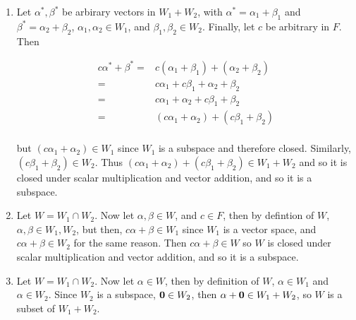 \documentclass[12pt]{article}
\renewcommand{\vec}[1]{
  {\bf #1}
}
\begin{document}
  {
    \begin{enumerate}
      \item Let $\alpha^*, \beta^*$ be arbirary vectors in $W_1 + W_2$, with
        $\alpha^* = \alpha_1 + \beta_1$ and $\beta^* = \alpha_2 + \beta_2$,
        $\alpha_1, \alpha_2 \in W_1$, and $\beta_1, \beta_2 \in W_2$. Finally,
        let $c$ be arbitrary in $F$. Then 

        \begin{align*}
          c \alpha^* + \beta^*
         =&c (\alpha_1 + \beta_1) + (\alpha_2 + \beta_2) \\
         =&c\alpha_1 + c\beta_1 + \alpha_2 + \beta_2 \\
         =&c\alpha_1 + \alpha_2 + c\beta_1 + \beta_2 \\
         =&(c\alpha_1 + \alpha_2) + (c\beta_1 + \beta_2) \\
        \end{align*}

        but $(c\alpha_1 + \alpha_2) \in W_1$ since $W_1$ is a subspace and
        therefore closed. Similarly, $(c\beta_1 + \beta_2) \in W_2$. Thus
        $(c\alpha_1 + \alpha_2) + (c\beta_1 + \beta_2) \in W_1 + W_2$ and so it
        is closed under scalar multiplication and vector addition, and so it is
        a subspace.

      \item Let $W = W_1 \cap W_2$. Now let $\alpha, \beta \in W$, and $c \in
        F$, then by defintion of $W$, $\alpha, \beta \in W_1, W_2$, but then,
        $c\alpha + \beta \in W_1$ since $W_1$ is a vector space, and $c\alpha +
        \beta \in W_2$ for the same reason. Then $c\alpha + \beta \in W$ so $W$
        is closed under scalar multiplication and vector addition, and so it is
        a subspace.

      \item Let $W = W_1 \cap W_2$. Now let $\alpha \in W$, then by definition
        of $W$, $\alpha \in W_1$ and $\alpha \in W_2$. Since $W_2$ is a
        subspace, $\vec{0} \in W_2$, then $\alpha + \vec{0} \in W_1 + W_2$, so
        $W$ is a subset of $W_1 + W_2$.

    \end{enumerate}
  }

  \newpage
\end{document}
